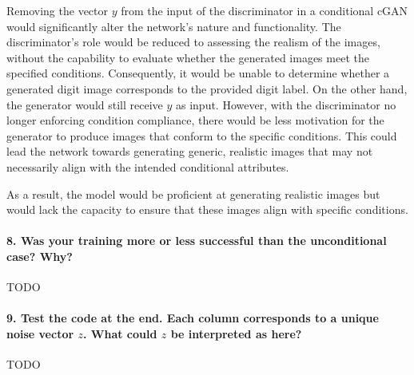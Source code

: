 Removing the vector $y$ from the input of the discriminator in a conditional cGAN would significantly alter the network's nature and functionality. The discriminator's role would be reduced to assessing the realism of the images, without the capability to evaluate whether the generated images meet the specified conditions. Consequently, it would be unable to determine whether a generated digit image corresponds to the provided digit label. On the other hand, the generator would still receive $y$ as input. However, with the discriminator no longer enforcing condition compliance, there would be less motivation for the generator to produce images that conform to the specific conditions. This could lead the network towards generating generic, realistic images that may not necessarily align with the intended conditional attributes.

As a result, the model would be proficient at generating realistic images but would lack the capacity to ensure that these images align with specific conditions.

\paragraph*{8. Was your training more or less successful than the unconditional case? Why?}

TODO

\paragraph*{9. Test the code at the end. Each column corresponds to a unique noise vector $z$. What could $z$ be interpreted as here?}

TODO
